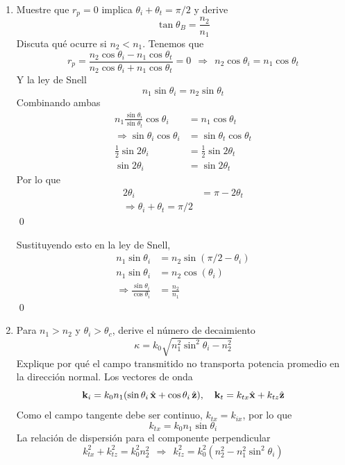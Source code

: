 \documentclass[]{article}
\numberwithin{equation}{section}
\begin{document}
\begin{enumerate}
	\item Muestre que $r_p = 0$ implica $\theta_i + \theta_t = \pi/2$ y derive
	\begin{equation}
		\tan \theta_B = \frac{n_2}{n_1}
	\end{equation}
	Discuta qué ocurre si $n_2 < n_1$.
	\resp Tenemos que
	\begin{equation}
		r_p = \frac{n_2\cos\theta_{i} - n_1\cos\theta_{t}}{n_2\cos\theta_{i} + n_1\cos\theta_{t}} = 0 ~~\Rightarrow~~ n_2\cos\theta_{i} = n_1\cos\theta_{t}
	\end{equation}
	Y la ley de Snell
	\begin{equation}
		n_1 \sin\theta_{i} = n_2 \sin\theta_{t}
	\end{equation}
	Combinando ambas
	\begin{align*}
		n_1 \frac{\sin\theta_{i}}{\sin\theta_{t}}\cos\theta_i &= n_1\cos\theta_{t}\\
		\Rightarrow \sin\theta_{i}\cos\theta_i &= \sin\theta_{t}\cos\theta_{t}\\
		\frac{1}{2} \sin 2\theta_i &= \frac{1}{2} \sin 2\theta_t\\
		\sin 2\theta_i &= \sin 2\theta_t
	\end{align*}
	Por lo que
	\begin{align}
		2\theta_i &= \pi - 2\theta_t\\
		\Rightarrow \theta_i + \theta_t = \pi/2
	\end{align}
	\qed
	
	Sustituyendo esto en la ley de Snell,
	\begin{align}
		n_1 \sin\theta_{i} &= n_2 \sin\left(\pi/2 - \theta_i\right)\nonumber\\
		n_1 \sin\theta_{i} &= n_2 \cos\left(\theta_i\right)\nonumber\\
		\Rightarrow \frac{\sin\theta_{i}}{\cos\theta_{i}} &= \frac{n_2}{n_1}
	\end{align}
	\qed
	
	\item Para $n_1 > n_2$ y $\theta_i > \theta_c$, derive el número de decaimiento
	\begin{equation}
		\kappa = k_0 \sqrt{n_1^2 \sin^2\theta_i - n_2^2}
	\end{equation}
	Explique por qué el campo transmitido no transporta potencia promedio en la dirección normal.
	\resp Los vectores de onda
	\begin{equation}
		\mathbf{k}_i = k_0 n_1(\sin\theta_i\,\hat{\mathbf{x}} + \cos\theta_i\,\hat{\mathbf{z}}), \quad \mathbf{k}_t = k_{tx}\hat{\mathbf{x}} + k_{tz}\hat{\mathbf{z}}
	\end{equation}
	Como el campo tangente debe ser continuo, $k_{tx} = k_{ix}$, por lo que
	\begin{equation}
		k_{tx} = k_0 n_1 \sin\theta_i
	\end{equation}
	La relación de dispersión para el componente perpendicular
	\begin{equation}
		k_{tx}^2 + k_{tz}^2 = k_0^2 n_2^2 ~~\Rightarrow~~ k_{tz}^2 = k_0^2 \left(n_2^2 - n_1^2\sin^2\theta_i\right)
	\end{equation}
	

\end{enumerate}
\end{document}
